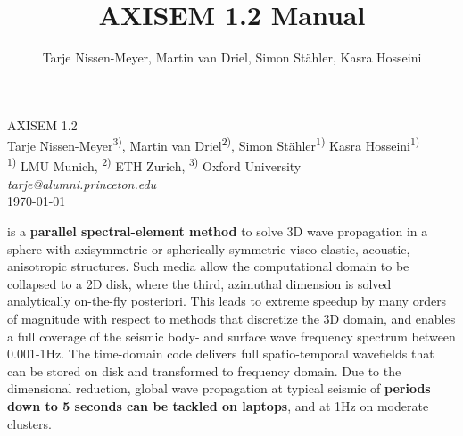 \documentclass[11pt,letter,fleqn,english,notitlepage]{article}
\title{AXISEM 1.2 Manual}
\author{Tarje Nissen-Meyer, Martin van Driel, Simon Stähler, Kasra Hosseini}
\begin{document}
%
\pagestyle{fancy}
\thispagestyle{empty}
%
\begin{center}
{\LARGE {\sc AXISEM 1.2}}
\vspace{1.cm}\\
{\large 
Tarje Nissen-Meyer\textsuperscript{3)},
Martin van Driel\textsuperscript{2)},
Simon St\"{a}hler\textsuperscript{1)}
Kasra Hosseini\textsuperscript{1)}
} \\
{\small \textsuperscript{1)} LMU Munich, \textsuperscript{2)} ETH Zurich, 
\textsuperscript{3)} Oxford University \\
\vspace*{0.2cm}
\textit{tarje@alumni.princeton.edu} \hspace*{0.75cm}
\vspace*{0.5cm}\\ 
\today}
\end{center}

\vspace*{1.6cm}
 is a \textbf{parallel spectral-element method} to solve
3D wave propagation in a sphere with axisymmetric or spherically symmetric
visco-elastic, acoustic, anisotropic structures. Such media allow the
computational domain to be collapsed to a 2D disk, where the third, azimuthal
dimension is solved analytically on-the-fly posteriori. This leads to extreme
speedup by many orders of magnitude with respect to methods that discretize the
3D domain, and enables a full coverage of the seismic body- and surface wave
frequency spectrum between 0.001-1Hz.  The time-domain code delivers full
spatio-temporal wavefields that can be stored on disk and transformed to
frequency domain. Due to the dimensional reduction, global wave propagation at
typical seismic of \textbf{periods down to 5 seconds can be tackled on
laptops}, and at 1Hz on moderate clusters.
\end{document}
